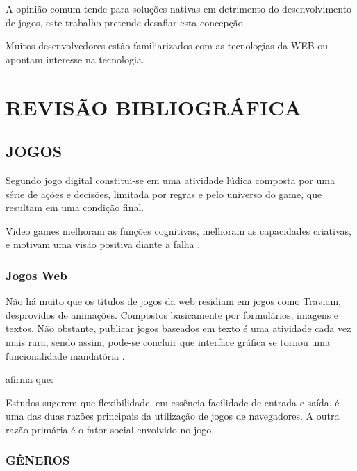 \documentclass[
12pt,
a4paper,
portuges,
draft
]{report}
\renewenvironment{quote}
               {\list{}{\rightmargin\leftmargin}%
                \item\relax\fontsize{10}{12}}
               {\endlist}
\begin{document}
A opinião comum tende para soluções nativas em detrimento do
desenvolvimento de jogos, este trabalho pretende desafiar esta
concepção. %

Muitos desenvolvedores estão familiarizados
com as tecnologias da WEB ou apontam interesse na tecnologia.


\chapter{REVISÃO BIBLIOGRÁFICA}

\section{JOGOS}
Segundo \autocite{indieGamesLemes} jogo digital constitui-se em uma
atividade lúdica composta por uma série de ações e decisões,
limitada por regras e pelo universo do game, que resultam em uma
condição final.

Video games melhoram as funções cognitivas, melhoram as capacidades criativas, e
motivam uma visão positiva diante a falha \autocite{gamebenefits}.

\subsection{Jogos Web}

Não há muito que os títulos de jogos da web residiam em jogos como Traviam, desprovidos de animações. Compostos basicamente por formulários, imagens e textos. Não obstante, publicar jogos baseados em texto é uma atividade cada vez mais rara, sendo assim, pode-se concluir que interface gráfica se tornou uma funcionalidade mandatória \autocite{browserGamesTechnologyAndFuture}.


\cite{browserGamesTechnologyAndFuture} afirma que:
\begin{quote}
Estudos sugerem que flexibilidade, em essência facilidade de entrada e saída, é uma das duas razões principais da utilização de jogos de navegadores. A outra razão primária é o fator social envolvido no jogo.
\end{quote}


\subsection{GÊNEROS}
\end{document}
